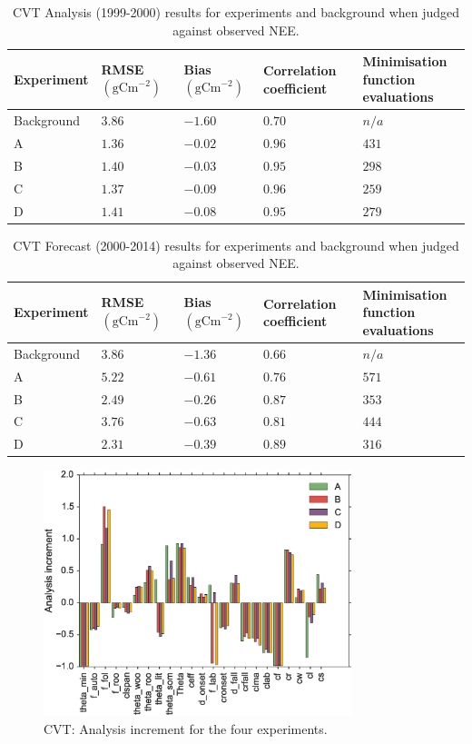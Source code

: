 \documentclass[11pt]{article}
\begin{document}
\begin{table}[ht] 
\begin{center}
	\begin{tabular}{| l | l | l | l | l |}
	\hline
	Experiment & RMSE $( \text{gCm}^{-2})$ & Bias $( \text{gCm}^{-2})$ & Correlation coefficient & \pbox{5cm}{Minimisation function \\ evaluations} \\ \hline
	Background & $3.86$ & $-1.60$ & $0.70$ & $n/a$ \\ \hline
	A & $1.36$ & $-0.02$ & $0.96$ & $431$ \\ \hline
	B & $1.40$ & $-0.03$ & $0.95$ & $298$  \\ \hline
	C & $1.37$ & $-0.09$ & $0.96$ & $259$ \\ \hline
	D & $1.41$ & $-0.08$ & $0.95$ & $279$ \\ 
	\hline
	\end{tabular}
	\caption{CVT Analysis (1999-2000) results for experiments and background when judged against observed NEE.}
	\label{table:exps_tab}
\end{center} 
\end{table}

\begin{table}[ht] 
\begin{center}
	\begin{tabular}{| l | l | l | l | l |}
	\hline
	Experiment & RMSE $( \text{gCm}^{-2})$ & Bias $( \text{gCm}^{-2})$ &  Correlation coefficient & \pbox{6cm}{Minimisation function \\ evaluations} \\ \hline
	Background & $3.86$ & $-1.36$ & $0.66$ & $n/a$ \\ \hline
	A & $5.22$ & $-0.61$ & $0.76$ & $571$ \\ \hline
	B & $2.49$ & $-0.26$ & $0.87$ & $353$  \\ \hline
	C & $3.76$ & $-0.63$ & $0.81$ & $444$ \\ \hline
	D & $2.31$ & $-0.39$ & $0.89$ & $316$ \\ 
	\hline
	\end{tabular}
	\caption{CVT Forecast (2000-2014) results for experiments and background when judged against observed NEE.}
	\label{table:exps_tab}
\end{center} 
\end{table}


\begin{figure}[ht]
    \centering
    \includegraphics[width=0.8\textwidth]{cvtinc.eps}
    \caption{CVT: Analysis increment for the four experiments.}
    \label{fig:testgradcostone}
\end{figure}
\end{document}
